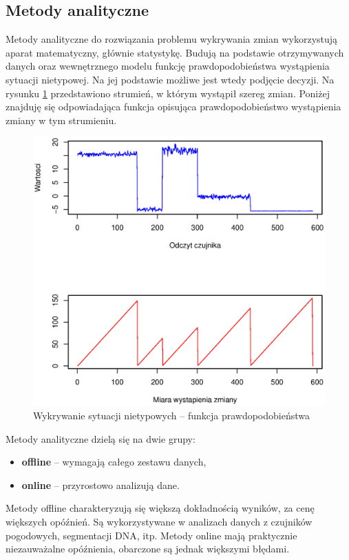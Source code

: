 \newpage
\subsection{Metody analityczne}

Metody analityczne do rozwiązania problemu wykrywania zmian wykorzystują aparat matematyczny,
głównie statystykę.
Budują na podstawie otrzymywanych danych
oraz wewnętrznego modelu funkcję prawdopodobieństwa wystąpienia sytuacji nietypowej.
Na jej podstawie możliwe jest wtedy podjęcie decyzji.
Na rysunku \ref{fig:SignalAnalytics} przedstawiono strumień,
w którym wystąpił szereg zmian.
Poniżej znajduję się odpowiadająca funkcja opisująca prawdopodobieństwo wystąpienia zmiany w tym strumieniu.
\begin{figure}[htbp]
\centering
	\includegraphics[width=1\textwidth]{img/ch-2-change}
	\caption{Wykrywanie sytuacji nietypowych -- funkcja prawdopodobieństwa}
  \label{fig:SignalAnalytics}
\end{figure}

Metody analityczne dzielą się na dwie grupy:
\begin{itemize}
  \item \textbf{offline} -- wymagają całego zestawu danych,
  \item \textbf{online} -- przyrostowo analizują dane.
\end{itemize}
Metody offline charakteryzują się większą dokładnością wyników,
za cenę większych opóźnień.
Są wykorzystywane w analizach danych z czujników pogodowych, segmentacji DNA, itp.
Metody online mają praktycznie niezauważalne opóźnienia,
obarczone są jednak większymi błędami.
